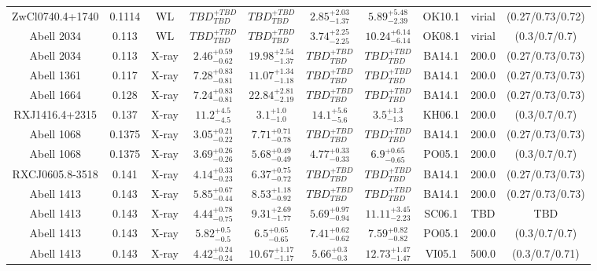 \begin{table}
\begin{tabular}{cccccccccc}
ZwCl0740.4+1740 & 0.1114 & WL & ${TBD}^{+TBD}_{TBD}$ & ${TBD}^{+TBD}_{TBD}$ & ${2.85}^{+2.03}_{-1.37}$ & ${5.89}^{+5.48}_{-2.39}$ & OK10.1 & virial & (0.27/0.73/0.72) \\
Abell 2034 & 0.113 & WL & ${TBD}^{+TBD}_{TBD}$ & ${TBD}^{+TBD}_{TBD}$ & ${3.74}^{+2.25}_{-2.25}$ & ${10.24}^{+6.14}_{-6.14}$ & OK08.1 & virial & (0.3/0.7/0.7) \\
Abell 2034 & 0.113 & X-ray & ${2.46}^{+0.59}_{-0.62}$ & ${19.98}^{+2.54}_{-1.37}$ & ${TBD}^{+TBD}_{TBD}$ & ${TBD}^{+TBD}_{TBD}$ & BA14.1 & 200.0 & (0.27/0.73/0.73) \\
Abell 1361 & 0.117 & X-ray & ${7.28}^{+0.83}_{-0.81}$ & ${11.07}^{+1.34}_{-1.18}$ & ${TBD}^{+TBD}_{TBD}$ & ${TBD}^{+TBD}_{TBD}$ & BA14.1 & 200.0 & (0.27/0.73/0.73) \\
Abell 1664 & 0.128 & X-ray & ${7.24}^{+0.83}_{-0.81}$ & ${22.84}^{+2.81}_{-2.19}$ & ${TBD}^{+TBD}_{TBD}$ & ${TBD}^{+TBD}_{TBD}$ & BA14.1 & 200.0 & (0.27/0.73/0.73) \\
RXJ1416.4+2315 & 0.137 & X-ray & ${11.2}^{+4.5}_{-4.5}$ & ${3.1}^{+1.0}_{-1.0}$ & ${14.1}^{+5.6}_{-5.6}$ & ${3.5}^{+1.3}_{-1.3}$ & KH06.1 & 200.0 & (0.3/0.7/0.7) \\
Abell 1068 & 0.1375 & X-ray & ${3.05}^{+0.21}_{-0.22}$ & ${7.71}^{+0.71}_{-0.78}$ & ${TBD}^{+TBD}_{TBD}$ & ${TBD}^{+TBD}_{TBD}$ & BA14.1 & 200.0 & (0.27/0.73/0.73) \\
Abell 1068 & 0.1375 & X-ray & ${3.69}^{+0.26}_{-0.26}$ & ${5.68}^{+0.49}_{-0.49}$ & ${4.77}^{+0.33}_{-0.33}$ & ${6.9}^{+0.65}_{-0.65}$ & PO05.1 & 200.0 & (0.3/0.7/0.7) \\
RXCJ0605.8-3518 & 0.141 & X-ray & ${4.14}^{+0.33}_{-0.23}$ & ${6.37}^{+0.75}_{-0.72}$ & ${TBD}^{+TBD}_{TBD}$ & ${TBD}^{+TBD}_{TBD}$ & BA14.1 & 200.0 & (0.27/0.73/0.73) \\
Abell 1413 & 0.143 & X-ray & ${5.85}^{+0.67}_{-0.44}$ & ${8.53}^{+1.18}_{-0.92}$ & ${TBD}^{+TBD}_{TBD}$ & ${TBD}^{+TBD}_{TBD}$ & BA14.1 & 200.0 & (0.27/0.73/0.73) \\
Abell 1413 & 0.143 & X-ray & ${4.44}^{+0.78}_{-0.75}$ & ${9.31}^{+2.69}_{-1.77}$ & ${5.69}^{+0.97}_{-0.94}$ & ${11.11}^{+3.45}_{-2.23}$ & SC06.1 & TBD & TBD \\
Abell 1413 & 0.143 & X-ray & ${5.82}^{+0.5}_{-0.5}$ & ${6.5}^{+0.65}_{-0.65}$ & ${7.41}^{+0.62}_{-0.62}$ & ${7.59}^{+0.82}_{-0.82}$ & PO05.1 & 200.0 & (0.3/0.7/0.7) \\
Abell 1413 & 0.143 & X-ray & ${4.42}^{+0.24}_{-0.24}$ & ${10.67}^{+1.17}_{-1.17}$ & ${5.66}^{+0.3}_{-0.3}$ & ${12.73}^{+1.47}_{-1.47}$ & VI05.1 & 500.0 & (0.3/0.7/0.71) \\

\end{tabular}
\end{table}
